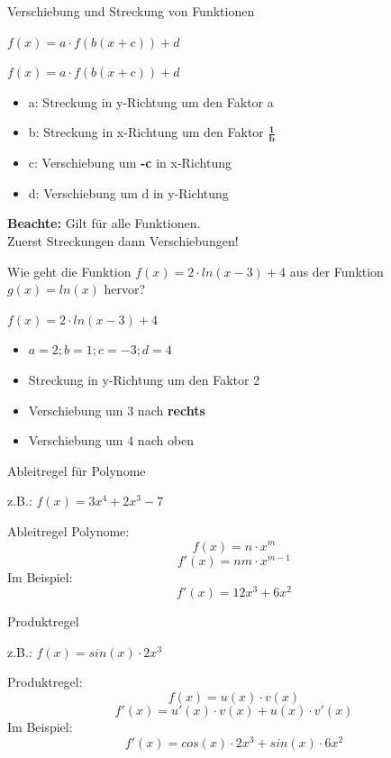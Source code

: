 \documentclass[paper=a6,landscape,ngerman,twoside=true,fontsize=12pt]{scrartcl}
\begin{document}
\begin{frage}
	Verschiebung und Streckung von Funktionen  \bigskip
	
	$f(x)=a \cdot f(b(x+c))+d$
\end{frage}
\begin{antwort}
	\large
	$f(x)=a \cdot f(b(x+c))+d$
	\begin{itemize}

		\item a: Streckung in y-Richtung um den Faktor a
		\item b: Streckung in x-Richtung um den Faktor $\mathbf{\frac{1}{b}}$
		\item c: Verschiebung um \textbf{-c} in x-Richtung
		\item d: Verschiebung um d in y-Richtung
							
	\end{itemize}
	\textbf{Beachte:} Gilt für alle Funktionen.\\
	 Zuerst Streckungen dann Verschiebungen!
\end{antwort}
\begin{frage}
	Wie geht die Funktion $f(x)=2 \cdot ln(x-3)+4$ aus der 
	Funktion $g(x)=ln(x)$ hervor?
\end{frage}
\begin{antwort}
	$f(x)=2 \cdot ln(x-3)+4$
	\begin{itemize}
		\item $a=2;b=1;c=-3;d=4$
		\item Streckung in y-Richtung um den Faktor 2		
		\item Verschiebung um 3 nach \textbf{rechts}
		\item Verschiebung um 4 nach oben							
	\end{itemize}	
\end{antwort}
\begin{frage}
	Ableitregel für Polynome
	
	z.B.: $f(x)=3x^4+2x^3-7$
	
\end{frage}
\begin{antwort}
	Ableitregel Polynome:
	\[
	f(x) = n \cdot x^m
	\]
	\[	
	f'(x)= nm \cdot x^{m-1}
	\]
	Im Beispiel:
	\[
	f'(x)=12x^3+6x^2
	\]
\end{antwort}
\begin{frage}
	Produktregel
	
	z.B.: $f(x)=sin(x)\cdot2x^3$
	
\end{frage}
\begin{antwort}
	Produktregel:
	\[
	f(x) = u(x)\cdot v(x)
	\]
	\[
	f'(x)=u'(x)\cdot v(x)+u(x)\cdot v'(x)
	\]
	Im Beispiel:
	\[
	f'(x)=cos(x)\cdot 2x^3 + sin(x)\cdot 6x^2
	\]
\end{antwort}
\end{document}

